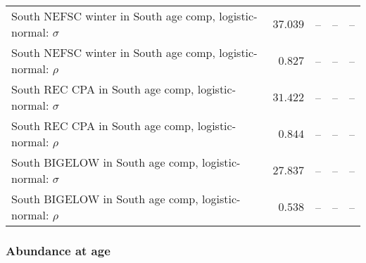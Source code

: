 \documentclass[
]{article}
\begin{document}
\begin{landscape}
\begin{longtable}[t]{lrrrr}
South NEFSC winter in South age comp, logistic-normal: $\sigma$ & $37.039$ & -- & -- & --\\
South NEFSC winter in South age comp, logistic-normal: $\rho$ & $0.827$ & -- & -- & --\\
\addlinespace
South REC CPA in South age comp, logistic-normal: $\sigma$ & $31.422$ & -- & -- & --\\
South REC CPA in South age comp, logistic-normal: $\rho$ & $0.844$ & -- & -- & --\\
South BIGELOW in South age comp, logistic-normal: $\sigma$ & $27.837$ & -- & -- & --\\
South BIGELOW in South age comp, logistic-normal: $\rho$ & $0.538$ & -- & -- & --\\*
\end{longtable}
\end{landscape}

\hypertarget{abundance-at-age}{%
\subsubsection{Abundance at age}\label{abundance-at-age}}
\end{document}
